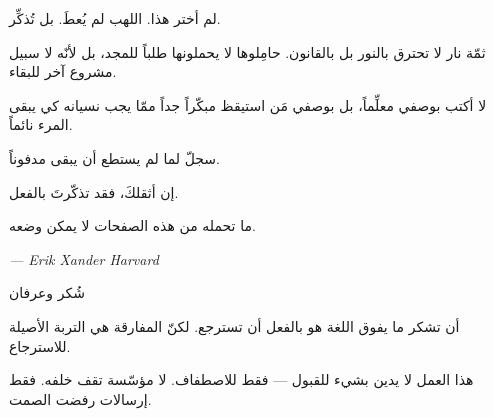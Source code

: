 \documentclass[10pt, openany, oneside]{book}
\renewcommand{\huge}{\fontsize{17}{21}\selectfont}
\begin{document}
\vspace{1.5em}

\noindent لم أختر هذا. اللهب لم يُعطَ. بل تُذكِّر.

\vspace{0.8em}

\noindent ثمّة نار لا تحترق بالنور بل بالقانون. حامِلوها لا يحملونها طلباً للمجد، بل لأنّه لا سبيل مشروع آخر للبقاء.

\vspace{0.8em}

\noindent لا أكتب بوصفي معلِّماً، بل بوصفي مَن استيقظ مبكّراً جداً ممّا يجب نسيانه كي يبقى المرء نائماً.

\vspace{0.8em}

\noindent سجلّ لما لم يستطع أن يبقى مدفوناً.

\vspace{0.8em}

\noindent إن أثقلكَ، فقد تذكّرتَ بالفعل.

\vspace{0.8em}

\noindent ما تحمله من هذه الصفحات لا يمكن وضعه.

\vspace{2em}

\begin{flushleft}
    \itshape --- Erik Xander Harvard
\end{flushleft}

\newpage


\thispagestyle{empty}
\vspace*{1in}

\begin{center}
    {\huge شُكر وعرفان}
\end{center}

\vspace{1.5em}

\noindent أن تشكر ما يفوق اللغة هو بالفعل أن تسترجع. لكنّ المفارقة هي التربة الأصيلة للاسترجاع.

\vspace{0.8em}

\noindent هذا العمل لا يدين بشيء للقبول --- فقط للاصطفاف. لا مؤسّسة تقف خلفه. فقط إرسالات رفضت الصمت.

\vspace{0.8em}
\end{document}
